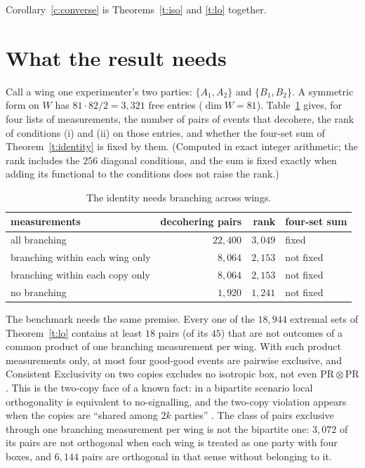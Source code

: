 \documentclass[11pt,a4paper]{article}
\theoremstyle{definition}
\theoremstyle{remark}
\newcommand{\PR}{\mathrm{PR}}
\begin{document}
Corollary~\ref{c:converse} is Theorems~\ref{t:iso} and \ref{t:lo} together.

\section{What the result needs}\label{s:needs}

Call a wing one experimenter's two parties: $\{A_1,A_2\}$ and $\{B_1,B_2\}$. A symmetric form on $W$
has $81\cdot82/2=3{,}321$ free entries ($\dim W=81$). Table~\ref{tab:rank} gives, for four lists of
measurements, the number of pairs of events that decohere, the rank of conditions (i) and (ii) on those
entries, and whether the four-set sum of Theorem~\ref{t:identity} is fixed by them. (Computed in exact
integer arithmetic; the rank includes the $256$ diagonal conditions, and the sum is fixed exactly when
adding its functional to the conditions does not raise the rank.)

\begin{table}[h]
\centering
\begin{tabular}{lrrl}
measurements & decohering pairs & rank & four-set sum \\ \hline
all branching & $22{,}400$ & $3{,}049$ & fixed \\
branching within each wing only & $8{,}064$ & $2{,}153$ & not fixed \\
branching within each copy only & $8{,}064$ & $2{,}153$ & not fixed \\
no branching & $1{,}920$ & $1{,}241$ & not fixed
\end{tabular}
\caption{The identity needs branching across wings.}\label{tab:rank}
\end{table}

The benchmark needs the same premise. Every one of the $18{,}944$ extremal sets of
Theorem~\ref{t:lo} contains at least $18$ pairs (of its $45$) that are not outcomes of a common product
of one branching measurement per wing. With such product measurements only, at most four good-good
events are pairwise exclusive, and Consistent Exclusivity on two copies excludes no isotropic box, not
even $\PR\otimes\PR$. This is the two-copy face of a known fact: in a bipartite scenario local
orthogonality is equivalent to no-signalling, and the two-copy violation appears when the copies are
``shared among $2k$ parties'' \cite{Sainz}. The class of pairs exclusive through one branching
measurement per wing is not the bipartite one: $3{,}072$ of its pairs are not orthogonal when each wing
is treated as one party with four boxes, and $6{,}144$ pairs are orthogonal in that sense without
belonging to it.
\end{document}
